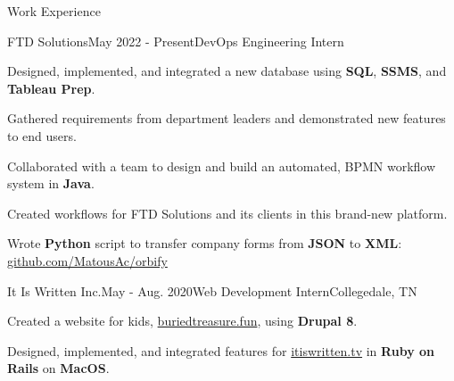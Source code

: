 \begin{rSection}{Work Experience}
  \begin{job}{FTD Solutions}{May 2022 - Present}{DevOps Engineering Intern}{}
    \item Designed, implemented, and integrated a new database using {\bf SQL}, {\bf SSMS}, and {\bf Tableau Prep}.
    \item Gathered requirements from department leaders and demonstrated new features to end users.
    \item Collaborated with a team to design and build an automated, BPMN workflow system in {\bf Java}.
    \item Created workflows for FTD Solutions and its clients in this brand-new platform.
    \item Wrote {\bf Python} script to transfer company forms from {\bf JSON} to {\bf XML}: \href{https://github.com/MatousAc/orbify}{github.com/MatousAc/orbify}
  \end{job}



  \begin{job}{It Is Written Inc.}{May - Aug. 2020}{Web Development Intern}{Collegedale, TN}
    \item Created a website for kids, \href{https://buriedtreasure.fun/}{buriedtreasure.fun}, using {\bf Drupal 8}.
    \item Designed, implemented, and integrated features for \href{https://itiswritten.tv}{itiswritten.tv} in {\bf Ruby on Rails} on {\bf MacOS}.
  \end{job}
\end{rSection}
